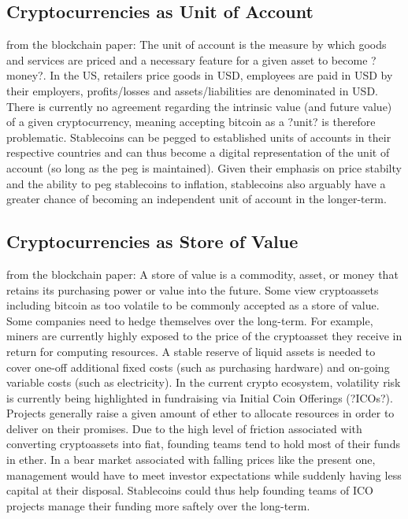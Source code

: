 \subsection{Cryptocurrencies as Unit of Account}
from the blockchain paper:
The unit of account is the measure by which goods and services are priced and a necessary feature for a
given asset to become ?money?. In the US, retailers price goods in USD, employees are paid in USD by their
employers, profits/losses and assets/liabilities are denominated in USD. There is currently no agreement
regarding the intrinsic value (and future value) of a given cryptocurrency, meaning accepting bitcoin as a
?unit? is therefore problematic.
Stablecoins can be pegged to established units of accounts in their respective countries and can thus
become a digital representation of the unit of account (so long as the peg is maintained). Given their
emphasis on price stabilty and the ability to peg stablecoins to inflation, stablecoins also arguably have a
greater chance of becoming an independent unit of account in the longer-term.

\subsection{Cryptocurrencies as Store of Value}
from the blockchain paper:
A store of value is a commodity, asset, or money that retains its purchasing power or value into the future.
Some view cryptoassets including bitcoin as too volatile to be commonly accepted as a store of value.
Some companies need to hedge themselves over the long-term. For example, miners are currently highly
exposed to the price of the cryptoasset they receive in return for computing resources. A stable reserve of
liquid assets is needed to cover one-off additional fixed costs (such as purchasing hardware) and on-going
variable costs (such as electricity).
In the current crypto ecosystem, volatility risk is currently being highlighted in fundraising via Initial Coin
Offerings (?ICOs?). Projects generally raise a given amount of ether to allocate resources in order to deliver
on their promises. Due to the high level of friction associated with converting cryptoassets into fiat,
founding teams tend to hold most of their funds in ether. In a bear market associated with falling prices
like the present one, management would have to meet investor expectations while suddenly having less
capital at their disposal. Stablecoins could thus help founding teams of ICO projects manage their funding
more saftely over the long-term.

